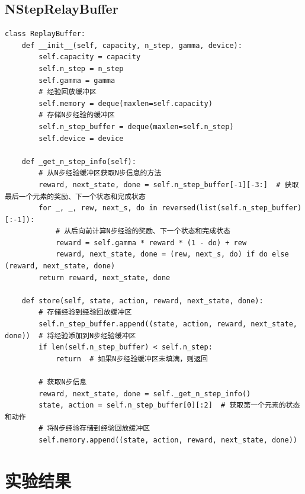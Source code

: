 \documentclass[a4paper]{ctexart}
\begin{document}
\subsection{NStepRelayBuffer}
\begin{verbatim}
class ReplayBuffer:
    def __init__(self, capacity, n_step, gamma, device):
        self.capacity = capacity
        self.n_step = n_step
        self.gamma = gamma
        # 经验回放缓冲区
        self.memory = deque(maxlen=self.capacity)
        # 存储N步经验的缓冲区
        self.n_step_buffer = deque(maxlen=self.n_step)
        self.device = device

    def _get_n_step_info(self):
        # 从N步经验缓冲区获取N步信息的方法
        reward, next_state, done = self.n_step_buffer[-1][-3:]  # 获取最后一个元素的奖励、下一个状态和完成状态
        for _, _, rew, next_s, do in reversed(list(self.n_step_buffer)[:-1]):
            # 从后向前计算N步经验的奖励、下一个状态和完成状态
            reward = self.gamma * reward * (1 - do) + rew
            reward, next_state, done = (rew, next_s, do) if do else (reward, next_state, done)
        return reward, next_state, done

    def store(self, state, action, reward, next_state, done):
        # 存储经验到经验回放缓冲区
        self.n_step_buffer.append((state, action, reward, next_state, done))  # 将经验添加到N步经验缓冲区
        if len(self.n_step_buffer) < self.n_step:
            return  # 如果N步经验缓冲区未填满，则返回

        # 获取N步信息
        reward, next_state, done = self._get_n_step_info()
        state, action = self.n_step_buffer[0][:2]  # 获取第一个元素的状态和动作
        # 将N步经验存储到经验回放缓冲区
        self.memory.append((state, action, reward, next_state, done))
\end{verbatim}


\section{实验结果}
\end{document}
